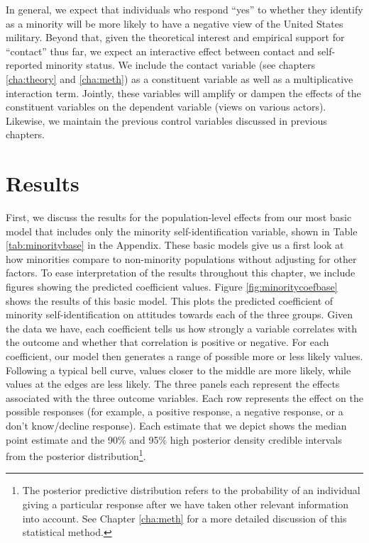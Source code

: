 


In general, we expect that individuals who respond ``yes'' to whether they identify as a minority will be more likely to have a negative view of the United States military. Beyond that, given the theoretical interest and empirical support for ``contact'' thus far, we expect an interactive effect between contact and self-reported minority status. We include the contact variable (see chapters \ref{cha:theory} and \ref{cha:meth}) as a constituent variable as well as a multiplicative interaction term. Jointly, these variables will amplify or dampen the effects of the constituent variables on the dependent variable (views on various actors). Likewise, we maintain the previous control variables discussed in previous chapters. 


\section*{Results}

First, we discuss the results for the population-level effects from our most basic model that includes only the minority self-identification variable, shown in Table \ref{tab:minoritybase} in the Appendix. These basic models give us a first look at how minorities compare to non-minority populations without adjusting for other factors. To ease interpretation of the results throughout this chapter, we include figures showing the predicted coefficient values. Figure \ref{fig:minoritycoefbase} shows the results of this basic model. This plots the predicted coefficient of minority self-identification on attitudes towards each of the three groups. Given the data we have, each coefficient tells us how strongly a variable correlates with the outcome and whether that correlation is positive or negative. For each coefficient, our model then generates a range of possible more or less likely values. Following a typical bell curve, values closer to the middle are more likely, while values at the edges are less likely. The three panels each represent the effects associated with the three outcome variables. Each row represents the effect on the possible responses (for example, a positive response, a negative response, or a don't know/decline response). Each estimate that we depict shows the median point estimate and the 90\% and 95\% high posterior density credible intervals from the posterior distribution\footnote{The posterior predictive distribution refers to the probability of an individual giving a particular response after we have taken other relevant information into account. See Chapter \ref{cha:meth} for a more detailed discussion of this statistical method.}. 

